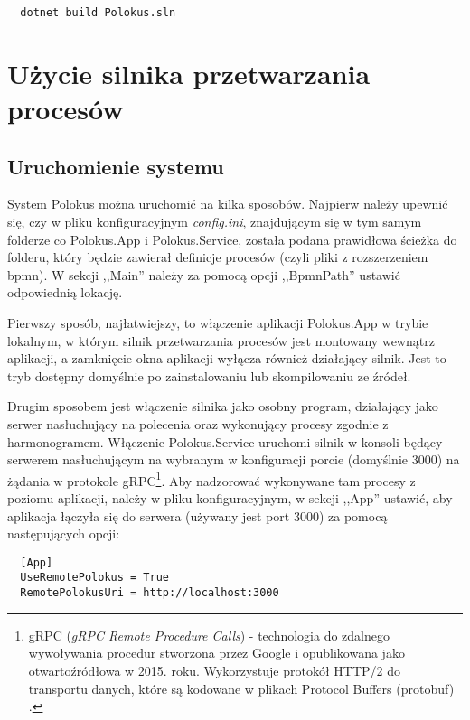 \documentclass[declaration,shortabstract,mgr]{iithesis}
\begin{document}
\begin{minipage}[c]{\textwidth}
\centering
\begin{lstlisting}
  dotnet build Polokus.sln
\end{lstlisting}
\end{minipage}


\section{Użycie silnika przetwarzania procesów}\label{subsection-use-polokus}

\subsection*{Uruchomienie systemu}

System Polokus można uruchomić na kilka sposobów. Najpierw należy upewnić się, czy w pliku konfiguracyjnym \textit{config.ini}, znajdującym się w tym samym folderze co Polokus.App i Polokus.Service, została podana prawidłowa ścieżka do folderu, który będzie zawierał definicje procesów (czyli pliki z rozszerzeniem bpmn). W sekcji ,,Main'' należy za pomocą opcji ,,BpmnPath'' ustawić odpowiednią lokację.

Pierwszy sposób, najłatwiejszy, to włączenie aplikacji Polokus.App w trybie lokalnym, w którym silnik przetwarzania procesów jest montowany wewnątrz aplikacji, a zamknięcie okna aplikacji wyłącza również działający silnik. Jest to tryb dostępny domyślnie po zainstalowaniu lub skompilowaniu ze źródeł.

Drugim sposobem jest włączenie silnika jako osobny program, działający jako serwer nasłuchujący na polecenia oraz wykonujący procesy zgodnie z harmonogramem. Włączenie Polokus.Service uruchomi silnik w konsoli będący serwerem nasłuchującym na wybranym w konfiguracji porcie (domyślnie 3000) na żądania w protokole gRPC\footnote{gRPC (\textit{gRPC Remote Procedure Calls}) - technologia do zdalnego wywoływania procedur stworzona przez Google i opublikowana jako otwartoźródłowa w 2015. roku. Wykorzystuje protokół HTTP/2 do transportu danych, które są kodowane w plikach Protocol Buffers (protobuf) \cite{wiki-grpc}.}. Aby nadzorować wykonywane tam procesy z poziomu aplikacji, należy w pliku konfiguracyjnym, w sekcji ,,App'' ustawić, aby aplikacja łączyła się do serwera (używany jest port 3000) za pomocą następujących opcji:

\begin{minipage}[c]{\textwidth}
\centering
\begin{lstlisting}
  [App]
  UseRemotePolokus = True
  RemotePolokusUri = http://localhost:3000
\end{lstlisting}
\end{minipage}
\end{document}
